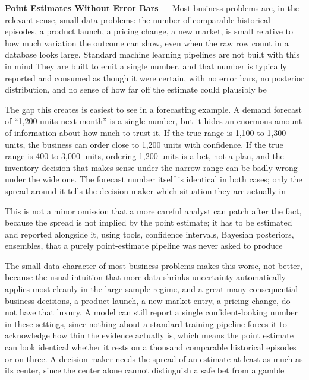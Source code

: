 \textbf{Point Estimates Without Error Bars} --- Most business problems are, in
the relevant sense, small-data problems: the number of comparable historical
episodes, a product launch, a pricing change, a new market, is small relative to
how much variation the outcome can show, even when the raw row count in a database
looks large. Standard machine learning pipelines are not built with this in mind
They are built to emit a single number, and that number is typically reported
and consumed as though it were certain, with no error bars, no posterior
distribution, and no sense of how far off the estimate could plausibly be

The gap this creates is easiest to see in a forecasting example. A demand forecast
of ``1,200 units next month'' is a single number, but it hides an enormous
amount of information about how much to trust it. If the true range is 1,100 to 1,300
units, the business can order close to 1,200 units with confidence. If the true range
is 400 to 3,000 units, ordering 1,200 units is a bet, not a plan, and the
inventory decision that makes sense under the narrow range can be badly wrong
under the wide one. The forecast number itself is identical in both cases; only
the spread around it tells the decision-maker which situation they are actually
in

This is not a minor omission that a more careful analyst can patch after the fact,
because the spread is not implied by the point estimate; it has to be estimated and
reported alongside it, using tools, confidence intervals, Bayesian posteriors, ensembles,
that a purely point-estimate pipeline was never asked to produce

The small-data character of most business problems makes this worse, not better,
because the usual intuition that more data shrinks uncertainty automatically applies
most cleanly in the large-sample regime, and a great many consequential business
decisions, a product launch, a new market entry, a pricing change, do not have
that luxury. A model can still report a single confident-looking number in these
settings, since nothing about a standard training pipeline forces it to
acknowledge how thin the evidence actually is, which means the point estimate can
look identical whether it rests on a thousand comparable historical episodes or on
three. A decision-maker needs the spread of an estimate at least as much as its
center, since the center alone cannot distinguish a safe bet from a gamble


